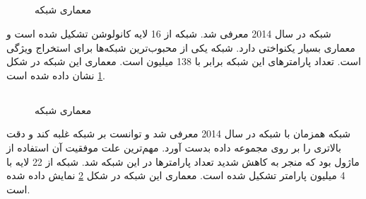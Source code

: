 \subsection{}
	\begin{figure}
		\caption[معماری شبکه ]{معماری شبکه 
			\href{https://towardsdatascience.com/illustrated-10-cnn-architectures-95d78ace614d\#c5a6}{}}
		\label{fig:VGGNet}
	\end{figure}
	شبکه 
	در سال 2014 معرفی شد. شبکه
	 از 16 لایه کانولوشن تشکیل شده است و معماری بسیار یکنواختی دارد. شبکه
	 یکی از محبوب‌ترین شبکه‌ها برای استخراج ویژگی است. تعداد پارامترهای این شبکه برابر با 138 میلیون است.  معماری این شبکه در شکل 
	 \ref{fig:VGGNet}
	 نشان داده شده است.
 
\subsection{}
	\begin{figure}
		\caption[معماری شبکه ]{معماری شبکه
			\href{https://towardsdatascience.com/illustrated-10-cnn-architectures-95d78ace614d\#81e0}{}}
		\label{fig:GoogleNet}
	\end{figure}
	شبکه
	همزمان با شبکه 
	در سال 2014 معرفی شد و  توانست بر شبکه
	غلبه کند و دقت بالاتری را بر روی مجموعه داده
	بدست آورد. مهم‌ترین علت موفقیت آن استفاده از ماژول
	بود که منجر به کاهش شدید تعداد پارامترها در این شبکه شد. شبکه
	از 22 لایه با 4 میلیون پارامتر تشکیل شده است. معماری این شبکه در شکل 
	\ref{fig:GoogleNet}
	نمایش داده شده است.

